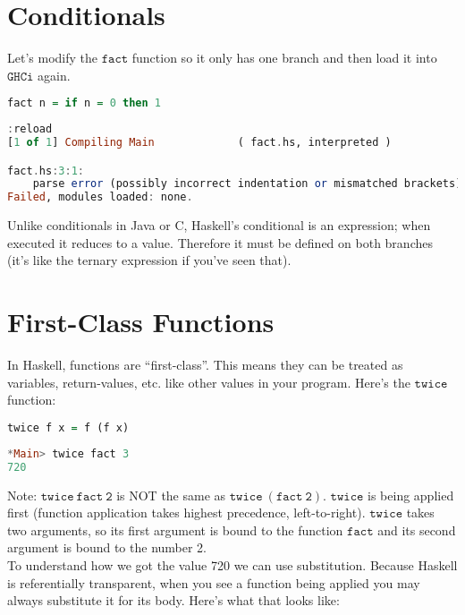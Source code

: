 \documentclass[a4paper,12pt]{article}
\newcommand{\keywadj}[1]{\mathtt{#1}}
\begin{document}
\section{Conditionals}

\noindent
Let's modify the $\keywadj{fact}$ function so it only has one branch and then load it into $\keywadj{GHCi}$ again.

\begin{lstlisting}[language=Haskell]
fact n = if n = 0 then 1
\end{lstlisting}

\begin{lstlisting}[language=Haskell]
:reload
[1 of 1] Compiling Main             ( fact.hs, interpreted )

fact.hs:3:1:
    parse error (possibly incorrect indentation or mismatched brackets)
Failed, modules loaded: none.
\end{lstlisting}

\noindent
Unlike conditionals in Java or C, Haskell's conditional is an expression; when executed it reduces to a value. Therefore it must be defined on both branches (it's like the ternary expression if you've seen that).

\section{First-Class Functions}
In Haskell, functions are ``first-class''. This means they can be treated as variables, return-values, etc. like other values in your program. Here's the $\keywadj{twice}$ function:

\begin{lstlisting}[language=Haskell]
twice f x = f (f x)
\end{lstlisting}

\begin{lstlisting}[language=Haskell]
*Main> twice fact 3
720
\end{lstlisting}

\noindent
Note: $\keywadj{twice~fact~2}$ is NOT the same as $\keywadj{twice~(fact~2)}$. $\keywadj{twice}$ is being applied first (function application takes highest precedence, left-to-right). $\keywadj{twice}$ takes two arguments, so its first argument is bound to the function $\keywadj{fact}$ and its second argument is bound to the number 2. \\

\noindent
To understand how we got the value 720 we can use substitution. Because Haskell is referentially transparent, when you see a function being applied you may always substitute it for its body. Here's what that looks like:
\end{document}
